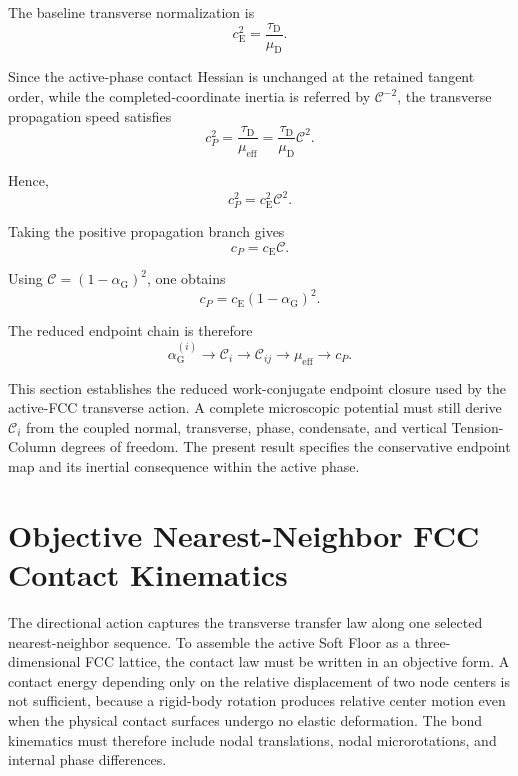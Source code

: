 The baseline transverse normalization is
\begin{equation}
    c_{\mathrm{E}}^2 = \frac{\tau_{\mathrm{D}}}{\mu_{\mathrm{D}}}.
\end{equation}

Since the active-phase contact Hessian is unchanged at the retained tangent order, while the completed-coordinate inertia is referred by $\mathcal{C}^{-2}$, the transverse propagation speed satisfies
\begin{equation}
    c_P^2 = \frac{\tau_{\mathrm{D}}}{\mu_{\mathrm{eff}}} = \frac{\tau_{\mathrm{D}}}{\mu_{\mathrm{D}}} \mathcal{C}^2.
\end{equation}

Hence,
\begin{equation}
    c_P^2 = c_{\mathrm{E}}^2\mathcal{C}^2.
\end{equation}

Taking the positive propagation branch gives
\begin{equation}
    c_P = c_{\mathrm{E}}\mathcal{C}.
\end{equation}

Using $\mathcal{C}=(1-\alpha_{\mathrm{G}})^2$, one obtains
\begin{equation}
    \boxed{ c_P = c_{\mathrm{E}} (1-\alpha_{\mathrm{G}})^2 }.
\end{equation}

The reduced endpoint chain is therefore
\begin{equation}
    \alpha_{\mathrm{G}}^{(i)} \longrightarrow \mathcal{C}_i \longrightarrow \mathcal{C}_{ij} \longrightarrow \mu_{\mathrm{eff}} \longrightarrow c_P.
\end{equation}

This section establishes the reduced work-conjugate endpoint closure used by the active-FCC transverse action. A complete microscopic potential must still derive $\mathcal{C}_i$ from the coupled normal, transverse, phase, condensate, and vertical Tension-Column degrees of freedom. The present result specifies the conservative endpoint map and its inertial consequence within the active phase.

\section{Objective Nearest-Neighbor FCC Contact Kinematics}

The directional action captures the transverse transfer law along one selected nearest-neighbor sequence. To assemble the active Soft Floor as a three-dimensional FCC lattice, the contact law must be written in an objective form. A contact energy depending only on the relative displacement of two node centers is not sufficient, because a rigid-body rotation produces relative center motion even when the physical contact surfaces undergo no elastic deformation. The bond kinematics must therefore include nodal translations, nodal microrotations, and internal phase differences.


